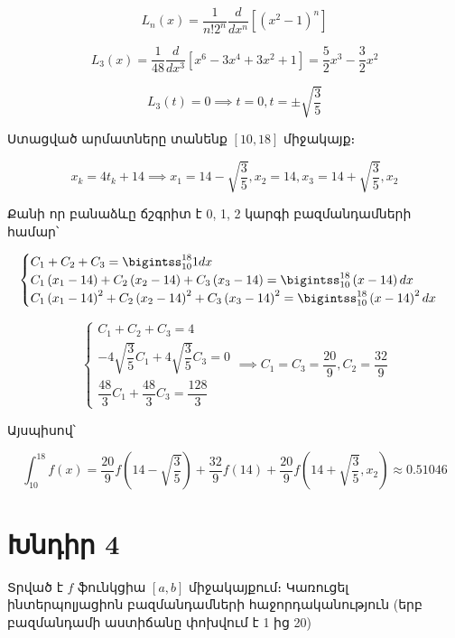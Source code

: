 \documentclass{article}
\begin{document}
\begin{enumerate}
			$$L_n\left(x\right) = \dfrac{1}{n ! 2 ^ {n}} \frac{d}{d x^{n}} \left[\left(x ^ {2} - 1\right) ^ {n} \right]$$

			$$L_3\left(x\right) = \dfrac{1}{48}\dfrac{d}{dx^{3}}\left[x ^ {6} - 3x^4 + 3x^2 +1\right] = \dfrac{5}{2} x^{3} - \dfrac{3}{2} x ^ {2}$$

			$$L_3\left(t\right) = 0 \implies t = 0, t = \pm \sqrt{\dfrac{3}{5}}$$

 
Ստացված արմատները տանենք $\left[10, 18\right]$ միջակայք։

							$$x_{k} = 4 t_{k} + 14 \implies x_{1} = 14 - \sqrt{\dfrac{3}{5}}, x_{2} = 14, x_{3} = 14 + \sqrt{\dfrac{3}{5}}, x_{2}$$


Քանի որ բանաձևը ճշգրիտ է 0, 1, 2 կարգի բազմանդամների համար՝

$$
\begin{cases}
 C_{1} + C_{2} + C_{3} = \bigintss_{10}^{18}1dx \\
 C_{1}\left(x_{1} - 14\right) + C_{2}\left(x_{2} - 14\right) + C_{3}\left(x_{3} - 14\right) = \bigintss_{10}^{18}\left(x - 14\right)dx \\
 C_{1}\left(x_{1} - 14\right)^{2} + C_{2}\left(x_{2} - 14\right)^{2} + C_{3}\left(x_{3} - 14\right)^{2} = \bigintss_{10}^{18}\left(x - 14\right)^{2}dx

\end{cases}
$$

$$
\begin{cases}
 C_{1} + C_{2} + C_{3} = 4 \\
 -4\sqrt{\dfrac{3}{5}}C_{1}  + 4\sqrt{\dfrac{3}{5}} C_{3} = 0\\
\dfrac{48}{3}C_{1}+ \dfrac{48}{3} C_{3} = \dfrac{128}{3} 

\end{cases} \implies C_{1} = C_{3} = \dfrac{20}{9}, C_{2} = \dfrac{32}{9}
$$

Այսպիսով՝

			$$\int_{10}^{18} f \left(x\right) = \dfrac{20}{9} f\left(14 - \sqrt{\dfrac{3}{5}}\right)+\dfrac{32}{9} f\left(14\right)+\dfrac{20}{9} f\left(14 + \sqrt{\dfrac{3}{5}}, x_{2}\right) \approx 0.51046$$
\end{enumerate}

\newpage


\section*{Խնդիր 4}

Տրված է $f$ ֆունկցիա $\left[a, b\right]$ միջակայքում։ Կառուցել ինտերպոլյացիոն բազմանդամների հաջորդականություն (երբ բազմանդամի աստիճանը փոխվում է   1 ից 20)
\end{document}

